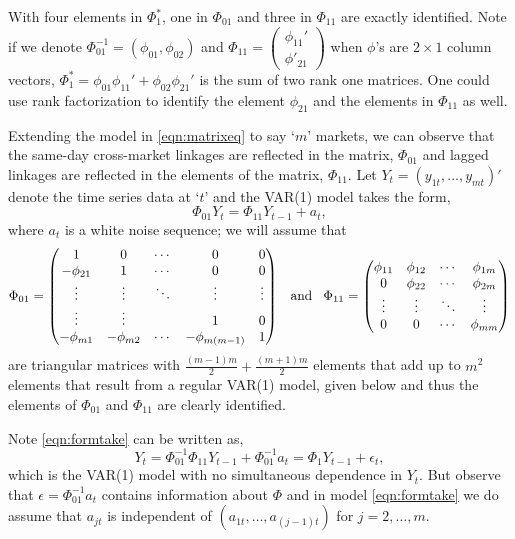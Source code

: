 With four elements in $\Phi_1^*$, one in $\Phi_{01}$ and three in $\Phi_{11}$ are exactly identified. Note  if we denote $\Phi^{-1}_{01} = (\phi_{01},\phi_{02})$ and $\Phi_{11} = \begin{pmatrix} \phi_{11}' \\ \phi'_{21} \end{pmatrix}$ when $\phi$'s are $2 \times 1$ column vectors, $\Phi_1^*=\phi_{01}\phi_{11}' + \phi_{02} \phi_{21}'$  is the sum of two rank one matrices. One could use rank factorization to identify the element $\phi_{21}$ and the elements in $\Phi_{11}$ as well. 


Extending the model in \eqref{eqn:matrixeq} to say `$m$' markets, we can observe that the same-day cross-market linkages are reflected in the matrix, $\Phi_{01}$ and lagged linkages are reflected in the elements of the matrix, $\Phi_{11}$. Let $Y_t = (y_{1t} ,\ldots, y_{mt})'$ denote the time series data at `$t$' and the VAR(1) model takes the form,
	\begin{equation} \label{eqn:formtake}
	\Phi_{01} Y_t= \Phi_{11} Y_{t-1} + a_t,
	\end{equation}
where $a_t$ is a white noise sequence; we will assume that
	\[
	\Phi_{01}= \begin{pmatrix} 
	1 & 0 & \cdots & 0 & 0 \\
	-\phi_{21} &  1 & \cdots & 0 & 0 \\
	\vdots & \vdots &  \ddots & \vdots & \vdots \\
	\vdots & \vdots & & 1  & 0 \\
	-\phi_{m1} & -\phi_{m2} & \cdots & -\phi_{m(m-1)} &  1 
	\end{pmatrix} \enskip \text{ and } \enskip
	\Phi_{11}= \begin{pmatrix}
	\phi_{11} &  \phi_{12} &  \cdots & \phi_{1m} \\
	0 & \phi_{22} & \cdots & \phi_{2m} \\
	\vdots & \vdots & \ddots & \vdots \\
	0 & 0 & \cdots & \phi_{mm} 
	\end{pmatrix}
	\]
are triangular matrices with $\frac{(m-1)m}{2}+ \frac{(m+1)m}{2}$ elements that add up to $m^2$ elements that result from a regular VAR(1) model, given below and thus the elements of $\Phi_{01}$
and $\Phi_{11}$ are clearly identified. 


Note \eqref{eqn:formtake} can be written as,
	\begin{equation} \label{eqn:rewrittenas}
	Y_t= \Phi_{01}^{-1} \Phi_{11} Y_{t-1} + \Phi_{01}^{-1} a_t = \Phi_1 Y_{t-1} + \epsilon_t,
	\end{equation}
which is the VAR(1) model with no simultaneous dependence in $Y_t$. But observe that $\epsilon= \Phi_{01}^{-1} a_t$ contains information about $\Phi$ and in model \eqref{eqn:formtake} we do assume that  $a_{jt}$ is independent of $(a_{1t},\ldots, a_{(j-1)t})$ for $j = 2,\ldots,m$.


